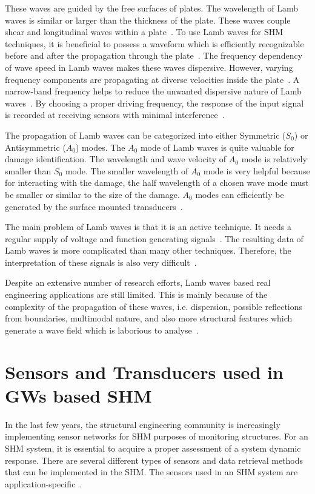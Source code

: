 \documentclass[b5paper, 11pt, titlepage]{book}
\begin{document}
These waves are guided by the free surfaces of plates. The wavelength of Lamb waves is similar or larger than the thickness of the plate. These waves couple shear and longitudinal waves within a plate~\cite{Farrar2012}. To use Lamb waves for SHM techniques, it is beneficial to possess a waveform which is efficiently recognizable before and after the propagation through the plate~\cite{Farrar2012}. The frequency dependency of wave speed in Lamb waves makes these waves dispersive. However, varying frequency components are propagating at diverse velocities inside the plate~\cite{Farrar2012}. A narrow-band frequency helps to reduce the unwanted dispersive nature of Lamb waves~\cite{Kessler2002}. By choosing a proper driving frequency, the response of the input signal is recorded at receiving sensors with minimal interference~\cite{Farrar2012}. 

The propagation of Lamb waves can be categorized into either Symmetric ($S_0$) or Antisymmetric ($A_0$) modes. The $A_0$ mode of Lamb waves is quite valuable for damage identification. The wavelength and wave velocity of $A_0$ mode is relatively smaller than $S_0$ mode. The smaller wavelength of $A_0$ mode is very helpful because for interacting with the damage, the half wavelength of a chosen wave mode must be smaller or similar to the size of the damage. $A_0$ modes can efficiently be generated by the surface mounted transducers~\cite{Ricci2016}.  

The main problem of Lamb waves is that it is an active technique. It needs a regular supply of voltage and function generating signals~\cite{MMaia, Kessler2002}. The resulting data of Lamb waves is more complicated than many other techniques. Therefore, the interpretation of these signals is also very difficult~\cite{Kessler2002}.

Despite an extensive number of research efforts, Lamb waves based real engineering applications are still limited. This is mainly because of the complexity of the propagation of these waves, i.e. dispersion, possible reflections from boundaries, multimodal nature, and also more structural features which generate a wave field which is laborious to analyse~\cite{stepinski2013advanced}.

\section{Sensors and Transducers used in GWs based SHM}
In the last few years, the structural engineering community is increasingly implementing sensor networks for SHM purposes of monitoring structures. For an SHM system, it is essential to acquire a proper assessment of a system dynamic response. There are several different types of sensors and data retrieval methods that can be implemented in the SHM. The sensors used in an SHM system are application-specific~\cite{Farrar2012}.
\end{document}
